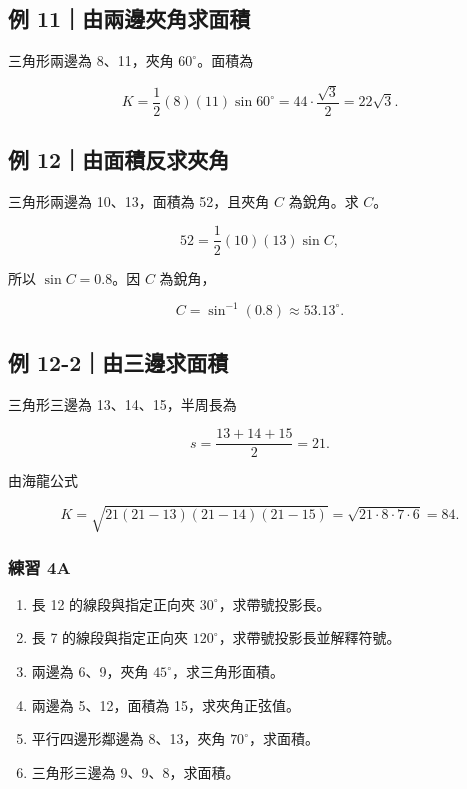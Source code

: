 \documentclass[11pt,a4paper]{article}
\providecommand{\tightlist}{%
  \setlength{\itemsep}{0pt}\setlength{\parskip}{0pt}}
\begin{document}
\subsection{例 11｜由兩邊夾角求面積}\label{ux4f8b-11ux7531ux5169ux908aux593eux89d2ux6c42ux9762ux7a4d}

三角形兩邊為 8、11，夾角 \(60^\circ\)。面積為

\[
K=\frac12(8)(11)\sin60^\circ
=44\cdot\frac{\sqrt3}{2}
=\boxed{22\sqrt3}.
\]

\subsection{例 12｜由面積反求夾角}\label{ux4f8b-12ux7531ux9762ux7a4dux53cdux6c42ux593eux89d2}

三角形兩邊為 10、13，面積為 52，且夾角 \(C\) 為銳角。求 \(C\)。

\[
52=\frac12(10)(13)\sin C,
\]

所以 \(\sin C=0.8\)。因 \(C\) 為銳角，

\[
C=\sin^{-1}(0.8)\approx\boxed{53.13^\circ}.
\]

\subsection{例 12-2｜由三邊求面積}\label{ux4f8b-12-2ux7531ux4e09ux908aux6c42ux9762ux7a4d}

三角形三邊為 13、14、15，半周長為

\[
s=\frac{13+14+15}{2}=21.
\]

由海龍公式

\[
K=\sqrt{21(21-13)(21-14)(21-15)}
=\sqrt{21\cdot8\cdot7\cdot6}
=\boxed{84}.
\]

\subsubsection{練習 4A}\label{ux7df4ux7fd2-4a}

\begin{enumerate}
\def\labelenumi{\arabic{enumi}.}
\tightlist
\item
  長 12 的線段與指定正向夾 \(30^\circ\)，求帶號投影長。
\item
  長 7 的線段與指定正向夾 \(120^\circ\)，求帶號投影長並解釋符號。
\item
  兩邊為 6、9，夾角 \(45^\circ\)，求三角形面積。
\item
  兩邊為 5、12，面積為 15，求夾角正弦值。
\item
  平行四邊形鄰邊為 8、13，夾角 \(70^\circ\)，求面積。
\item
  三角形三邊為 9、9、8，求面積。
\end{enumerate}
\end{document}
